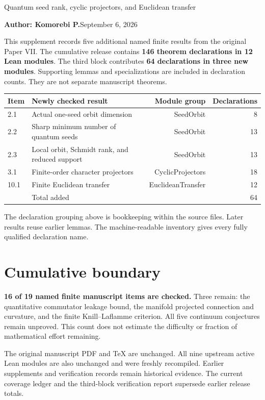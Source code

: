 \documentclass[10pt,letterpaper]{article}
\newcommand{\pageheading}[2]{\vspace*{2pt}{\small\color{ink}\textsc{#1}}\par\vspace{2pt}{\Large\bfseries #2}\par\vspace{4pt}}
\begin{document}
\thispagestyle{fancy}
\pageheading{Release record}{Third checked finite block}
{\large Quantum seed rank, cyclic projectors, and Euclidean transfer}\par
\textbf{Author: Komorebi P.}\hfill September 6, 2026

This supplement records five additional named finite results from the original Paper VII. The cumulative release contains \textbf{146 theorem declarations in 12 Lean modules}. The third block contributes \textbf{64 declarations in three new modules}. Supporting lemmas and specializations are included in declaration counts. They are not separate manuscript theorems.

\begin{center}
\renewcommand{\arraystretch}{1.22}
\begin{tabularx}{\linewidth}{@{}lXrr@{}}
\toprule
Item & Newly checked result & Module group & Declarations\\
\midrule
2.1 & Actual one-seed orbit dimension & SeedOrbit & 8\\
2.2 & Sharp minimum number of quantum seeds & SeedOrbit & 13\\
2.3 & Local orbit, Schmidt rank, and reduced support & SeedOrbit & 13\\
3.1 & Finite-order character projectors & CyclicProjectors & 18\\
10.1 & Finite Euclidean transfer & EuclideanTransfer & 12\\
\midrule
& Total added && 64\\
\bottomrule
\end{tabularx}
\end{center}
The declaration grouping above is bookkeeping within the source files. Later results reuse earlier lemmas. The machine-readable inventory gives every fully qualified declaration name.

\section*{Cumulative boundary}
\textbf{16 of 19 named finite manuscript items are checked.} Three remain: the quantitative commutator leakage bound, the manifold projected connection and curvature, and the finite Knill--Laflamme criterion. All five continuum conjectures remain unproved. This count does not estimate the difficulty or fraction of mathematical effort remaining.

The original manuscript PDF and TeX are unchanged. All nine upstream active Lean modules are also unchanged and were freshly recompiled. Earlier supplements and verification records remain historical evidence. The current coverage ledger and the third-block verification report supersede earlier release totals.
\end{document}
